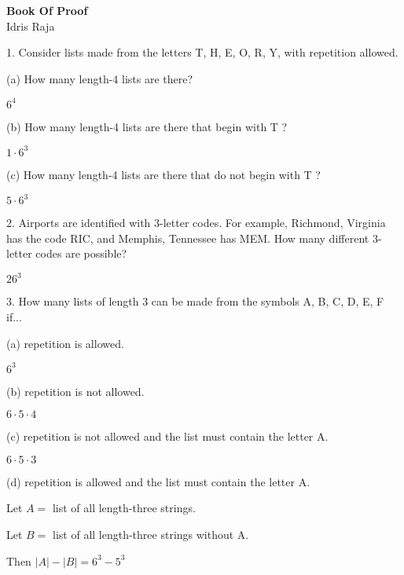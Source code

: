 \documentclass{idrisMemo}
\begin{document}
\begin{titlepage}
    \centering
    \vspace{2cm} %
    \begin{center}
        \Large \textbf{Book Of Proof} \\
        \normalsize Idris Raja
    \end{center}
\end{titlepage}
\pagebreak

\tableofcontents
\thispagestyle{styleTOC}
\pagebreak
\pagestyle{styleE}

\begin{prooflist} {1.  Consider lists made from the letters T, H, E, O, R, Y, with repetition allowed.}
    \item (a) How many length-4 lists are there?
    \item $ 6^4$
    \item (b) How many length-4 lists are there that begin with T ?
    \item $ 1 \cdot 6^3$
    \item (c) How many length-4 lists are there that do not begin with T ?
    \item $ 5 \cdot 6^3$
\end{prooflist}

\begin{prooflist} {2. Airports are identified with 3-letter codes. For example, Richmond, Virginia has the code RIC, and Memphis, Tennessee has MEM. How many different 3-letter codes are possible?}
    \item $ 26^3$
\end{prooflist}

\begin{prooflist} {3. How many lists of length 3 can be made from the symbols A, B, C, D, E, F if...}
    \item (a) repetition is allowed.
    \item $ 6^3$
    \item (b) repetition is not allowed.
    \item $ 6\cdot 5 \cdot 4$
    \item (c) repetition is not allowed and the list must contain the letter A.
    \item $ 6\cdot 5 \cdot 3$
    \item (d) repetition is allowed and the list must contain the letter A.
    \item Let $A=$ list of all length-three strings.
    \item Let $B=$ list of all length-three strings without A.
    \item Then $|A| - |B| = 6^3 - 5^3$
\end{prooflist}
\end{document}
